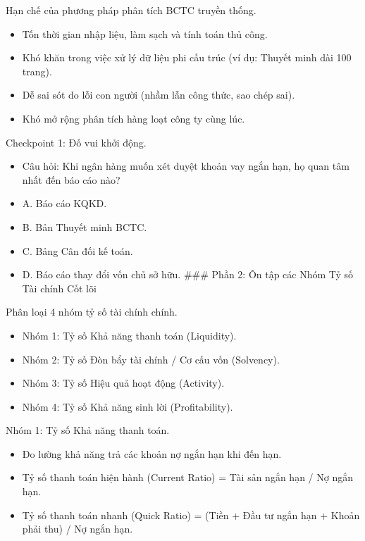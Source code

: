 \documentclass[aspectratio=169]{beamer}
\begin{document}
\begin{frame}{Hạn chế của phương pháp phân tích BCTC truyền thống.}
    \begin{itemize}
        \item Tốn thời gian nhập liệu, làm sạch và tính toán thủ công.
        \item Khó khăn trong việc xử lý dữ liệu phi cấu trúc (ví dụ: Thuyết minh dài 100 trang).
        \item Dễ sai sót do lỗi con người (nhầm lẫn công thức, sao chép sai).
        \item Khó mở rộng phân tích hàng loạt công ty cùng lúc.
    \end{itemize}
\end{frame}


\begin{frame}{Checkpoint 1: Đố vui khởi động.}
    \begin{itemize}
        \item Câu hỏi: Khi ngân hàng muốn xét duyệt khoản vay ngắn hạn, họ quan tâm nhất đến báo cáo nào?
        \item A. Báo cáo KQKD.
        \item B. Bản Thuyết minh BCTC.
        \item C. Bảng Cân đối kế toán.
        \item D. Báo cáo thay đổi vốn chủ sở hữu.
        ### Phần 2: Ôn tập các Nhóm Tỷ số Tài chính Cốt lõi
    \end{itemize}
\end{frame}


\begin{frame}{Phân loại 4 nhóm tỷ số tài chính chính.}
    \begin{itemize}
        \item Nhóm 1: Tỷ số Khả năng thanh toán (Liquidity).
        \item Nhóm 2: Tỷ số Đòn bẩy tài chính / Cơ cấu vốn (Solvency).
        \item Nhóm 3: Tỷ số Hiệu quả hoạt động (Activity).
        \item Nhóm 4: Tỷ số Khả năng sinh lời (Profitability).
    \end{itemize}
\end{frame}


\begin{frame}{Nhóm 1: Tỷ số Khả năng thanh toán.}
    \begin{itemize}
        \item Đo lường khả năng trả các khoản nợ ngắn hạn khi đến hạn.
        \item Tỷ số thanh toán hiện hành (Current Ratio) = Tài sản ngắn hạn / Nợ ngắn hạn.
        \item Tỷ số thanh toán nhanh (Quick Ratio) = (Tiền + Đầu tư ngắn hạn + Khoản phải thu) / Nợ ngắn hạn.
    \end{itemize}
\end{frame}
\end{document}
